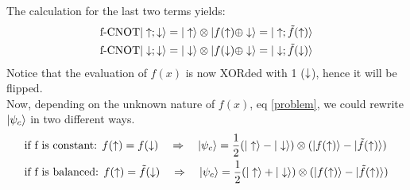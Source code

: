 The calculation for the last two terms yields:
\begin{equation}
  \begin{split}
    \text{f-CNOT}|\uparrow;\downarrow\rangle &=
    |\uparrow\rangle\otimes|f(\uparrow)\oplus \downarrow\rangle = |\uparrow;\tilde{f}(\uparrow)\rangle\\
    \text{f-CNOT}|\downarrow;\downarrow\rangle &=
    |\downarrow\rangle\otimes|f(\downarrow)\oplus \downarrow\rangle = |\downarrow;\tilde{f}(\downarrow)\rangle
  \end{split}
\end{equation}
Notice that the evaluation of $f(x)$ is now XORded with 1 ($\downarrow$), hence it will be flipped.\\

Now, depending on the unknown nature of $f(x)$, eq \eqref{problem}, we could rewrite $|\psi_c\rangle$ in two different ways.
\begin{equation}
  \begin{split}
    &\text{if f is constant:   }f(\uparrow)=f(\downarrow)\quad\Rightarrow\quad
    |\psi_c\rangle=
    \frac{1}{2}(|\uparrow\rangle-|\downarrow\rangle)\otimes
    (|f(\uparrow)\rangle-|\tilde{f}(\uparrow)\rangle)\\
    &\text{if f is balanced:   } f(\uparrow)=\tilde{f}(\downarrow)\quad\Rightarrow\quad
    |\psi_c\rangle=
    \frac{1}{2}(|\uparrow\rangle+|\downarrow\rangle)\otimes
    (|f(\uparrow)\rangle-|\tilde{f}(\uparrow)\rangle) \\
  \end{split}
\end{equation}


